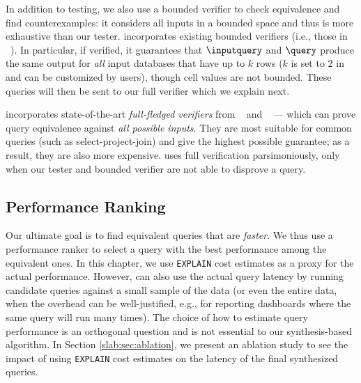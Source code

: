 In addition to testing, we also use a bounded verifier to check equivalence and find counterexamples: it considers all inputs in a bounded space and thus is more exhaustive than our tester. 
\toolname incorporates existing bounded verifiers (i.e., those in \cosette~\cite{chu2017cosette,wang2018speeding}). 
In particular, if verified, it guarantees that $\inputquery$ and $\query$ produce the same output for \emph{all} input databases that have up to $k$ rows ($k$ is set to 2 in \toolname and can be customized by users), though cell values are not bounded. 
These queries will then be sent to our full verifier which we explain next. 


\toolname incorporates state-of-the-art 
\emph{full-fledged verifiers} from \cosette~\cite{chu2017cosette} and \spes~\cite{zhou2022spes} --- which can prove query equivalence against \emph{all possible inputs}. 
They are most suitable for common queries (such as select-project-join) and give the highest possible guarantee; as a result, they are also more expensive. 
\slabcity uses full verification parsimoniously, only when our tester and bounded verifier are not able to disprove a query. 









\subsection{Performance Ranking}
\label{slab:sec:perfranking}

Our ultimate goal is to find equivalent queries that are \emph{faster}. 
We thus use a performance ranker to select a query with the best performance among the equivalent ones. 
In this chapter, we use \texttt{EXPLAIN} cost estimates as a proxy for the actual performance. 
However, \slabcity can also use the actual query latency by running candidate queries against a small sample of the data (or even the entire data, when the overhead can be well-justified, e.g., for reporting dashboards where the same query will run many times). 
The choice of how to estimate query performance is an orthogonal question and is not essential to our synthesis-based algorithm. 
In Section \ref{slab:sec:ablation}, we present an ablation study to see the impact of using \texttt{EXPLAIN} cost estimates on the latency of the final synthesized queries. 
